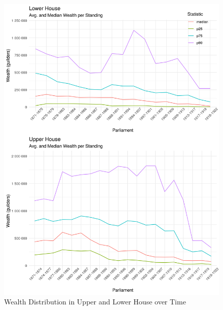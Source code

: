 \begin{figure}
    \centering
    \includegraphics[scale=0.8]{figures/step5fig2wealthperparl.png}
    \caption{Wealth Distribution in Upper and Lower House over Time}
    \label{fig:avgwealthtime}
\end{figure}
\clearpage

